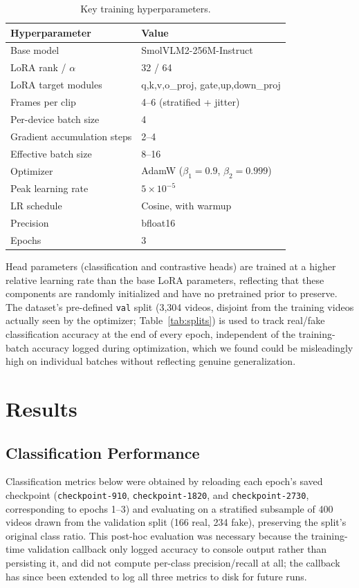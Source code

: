 \documentclass[acmsmall,review=false]{acmart}
\begin{document}
\begin{table}[h]
\centering
\caption{Key training hyperparameters.}
\label{tab:hparams}
\begin{tabular}{ll}
\toprule
\textbf{Hyperparameter} & \textbf{Value} \\
\midrule
Base model & SmolVLM2-256M-Instruct \\
LoRA rank / $\alpha$ & 32 / 64 \\
LoRA target modules & q,k,v,o\_proj, gate,up,down\_proj \\
Frames per clip & 4--6 (stratified + jitter) \\
Per-device batch size & 4 \\
Gradient accumulation steps & 2--4 \\
Effective batch size & 8--16 \\
Optimizer & AdamW ($\beta_1{=}0.9$, $\beta_2{=}0.999$) \\
Peak learning rate & $5\times10^{-5}$ \\
LR schedule & Cosine, with warmup \\
Precision & bfloat16 \\
Epochs & 3 \\
\bottomrule
\end{tabular}
\end{table}

Head parameters (classification and contrastive heads) are trained at a higher
relative learning rate than the base LoRA parameters, reflecting that these
components are randomly initialized and have no pretrained prior to preserve.
The dataset's pre-defined \texttt{val} split (3,304 videos, disjoint from the
training videos actually seen by the optimizer; Table~\ref{tab:splits}) is used
to track real/fake classification accuracy at the end of every epoch,
independent of the training-batch accuracy logged during optimization, which
we found could be misleadingly high on individual batches without reflecting
genuine generalization.

\section{Results}
\label{sec:results}

\subsection{Classification Performance}

Classification metrics below were obtained by reloading each epoch's saved
checkpoint (\texttt{checkpoint-910}, \texttt{checkpoint-1820}, and
\texttt{checkpoint-2730}, corresponding to epochs 1--3) and evaluating on a
stratified subsample of 400 videos drawn from the validation split (166 real,
234 fake), preserving the split's original class ratio. This post-hoc
evaluation was necessary because the training-time validation callback only
logged accuracy to console output rather than persisting it, and did not
compute per-class precision/recall at all; the callback has since been
extended to log all three metrics to disk for future runs.
\end{document}
